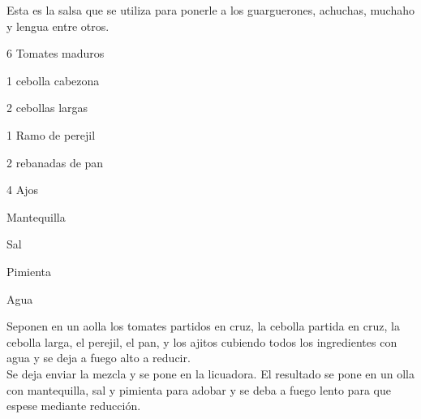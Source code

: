 Esta es la salsa que se utiliza para ponerle a los guarguerones, achuchas, muchaho y lengua entre otros.
\newline \\

\begin{ingredientes}
\item 6 Tomates maduros
\item 1 cebolla cabezona
\item 2 cebollas largas
\item 1 Ramo de perejil
\item 2 rebanadas de pan
\item 4 Ajos
\item Mantequilla
\item Sal
\item Pimienta
\item Agua
\end{ingredientes}
\preparacion
Seponen en un aolla los tomates partidos en cruz, la cebolla partida en cruz, la cebolla larga, el perejil, el pan, y los ajitos cubiendo todos los ingredientes con agua y se deja a fuego alto a reducir.\\

Se deja enviar la mezcla y se pone en la licuadora. El resultado se pone en un olla con mantequilla, sal y pimienta para adobar y se deba a fuego lento para que espese mediante reducción.\\
